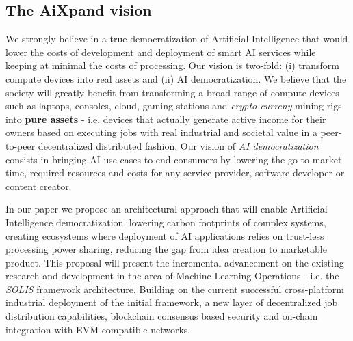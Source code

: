 \documentclass{article}
\begin{document}
\subsection{The AiXpand vision}
We strongly believe in a true democratization of Artificial Intelligence that would lower the costs of development and deployment of smart AI services while keeping at minimal the costs of processing. Our vision is two-fold: (i) transform compute devices into real assets and (ii) AI democratization. We believe that the society will greatly benefit from transforming a broad range of compute devices such as laptops, consoles, cloud, gaming stations and \emph{crypto-curreny} mining rigs into \textbf{pure assets} - i.e. devices that actually generate active income for their owners based on executing jobs with real industrial and societal value in a peer-to-peer decentralized distributed fashion. Our vision of \textit{AI democratization} consists in bringing AI use-cases to end-consumers by lowering the go-to-market time, required resources and costs for any service provider, software developer or content creator.

In our paper we propose an architectural approach that will enable Artificial Intelligence democratization, lowering carbon footprints of complex systems, creating ecosystems where deployment of AI applications relies on trust-less processing power sharing, reducing the gap from idea creation to marketable product. This proposal will present the incremental advancement on the existing research and development in the area of Machine Learning Operations - i.e. the \emph{SOLIS}\cite{ciobanu2021solis} framework architecture. Building on the current successful cross-platform industrial deployment of the initial framework, a new layer of decentralized job distribution capabilities, blockchain consensus based security and on-chain integration with EVM\cite{wood2014ethereum} compatible networks.
\end{document}
